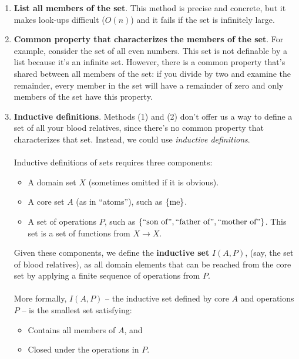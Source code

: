 \documentclass[]{article}
\DeclarePairedDelimiter{\set}{\lbrace}{\rbrace}
\theoremstyle{definition}
\begin{document}
        \begin{enumerate}
          \item \textbf{List all members of the set}. This method is precise and concrete, but it makes look-ups difficult ($O(n)$) and it fails if the set is infinitely large.
          \item \textbf{Common property that characterizes the members of the set}. For example, consider the set of all even numbers. This set is not definable by a list because it's an infinite set. However, there is a common property that's shared between all members of the set: if you divide by two and examine the remainder, every member in the set will have a remainder of zero and only members of the set have this property.
          \item \textbf{Inductive definitions}. Methods (1) and (2) don't offer us a way to define a set of all your blood relatives, since there's no common property that characterizes that set. Instead, we could use \emph{inductive definitions}.
          \\ \\
          Inductive definitions of sets requires three components:
          \begin{itemize}
            \item A domain set $X$ (sometimes omitted if it is obvious).
            \item A core set $A$ (as in ``atoms''), such as $\set{ \text{me} }$.
            \item A set of operations $P$, such as $\set{ \text{``son of''}, \text{``father of''}, \text{``mother of''}}$. This set is a set of functions from $X \to X$.
          \end{itemize}

          Given these components, we define the \textbf{inductive set} $I(A, P)$, (say, the set of blood relatives), as all domain elements that can be reached from the core set by applying a finite sequence of operations from $P$.
          \\ \\
          More formally,  $I(A, P)$ -- the inductive set defined by core $A$ and operations $P$ -- is the smallest set satisfying:
          \begin{itemize}
            \item Contains all members of $A$, and
            \item Closed under the operations in $P$.
          \end{itemize}


\end{enumerate}
\end{document}
